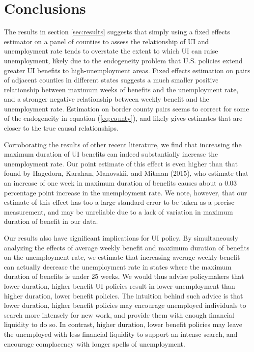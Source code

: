 \documentclass[12pt]{article}
\begin{document}
\section{Conclusions \label{sec:conclusions}}

The results in section \ref{sec:results} suggests that simply using a fixed effects estimator on a panel of counties to assess the relationship of UI and unemployment rate tends to overstate the extent to which UI can raise unemployment, likely due to the endogeneity problem that U.S. policies extend greater UI benefits to high-unemployment areas. Fixed effects estimation on pairs of adjacent counties in different states suggests a much smaller positive relationship between maximum weeks of benefits and the unemployment rate, and a stronger negative relationship between weekly benefit and the unemployment rate. Estimation on border county pairs seems to correct for some of the endogeneity in equation (\ref{eq:county}), and likely gives estimates that are closer to the true causal relationships.

Corroborating the results of other recent literature, we find that increasing the maximum duration of UI benefits can indeed substantially increase the unemployment rate. Our point estimate of this effect is even higher than that found by Hagedorn, Karahan, Manovskii, and Mitman (2015), who estimate that an increase of one week in maximum duration of benefits causes about a 0.03 percentage point increase in the unemployment rate. We note, however, that our estimate of this effect has too a large standard error to be taken as a precise measurement, and may be unreliable due to a lack of variation in maximum duration of benefit in our data.

Our results also have significant implications for UI policy. By simultaneously analyzing the effects of average weekly benefit and maximum duration of benefits on the unemployment rate, we estimate that increasing average weekly benefit can actually decrease the unemployment rate in states where the maximum duration of benefits is under 25 weeks. We would thus advise policymakers that lower duration, higher benefit UI policies result in lower unemployment than higher duration, lower benefit policies. The intuition behind such advice is that lower duration, higher benefit policies may encourage unemployed individuals to search more intensely for new work, and provide them with enough financial liquidity to do so. In contrast, higher duration, lower benefit policies may leave the unemployed with less financial liquidity to support an intense search, and encourage complacency with longer spells of unemployment.
\end{document}
